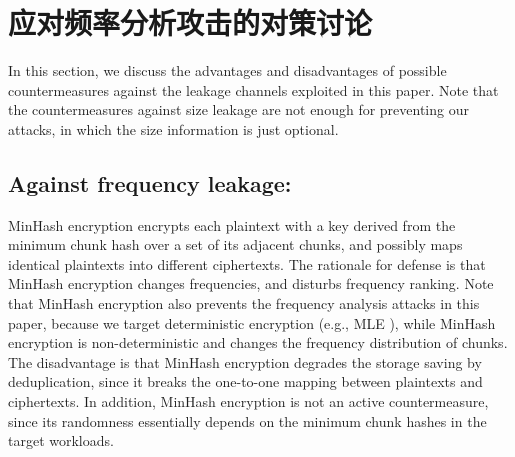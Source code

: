 \chapter{应对频率分析攻击的对策讨论}
\label{sec:Countermeasure}

In this section, we discuss the advantages and disadvantages of possible countermeasures against the leakage channels exploited in this paper. Note that the countermeasures against size leakage are not enough for preventing our attacks, in which the size information is just optional.  

\section{Against frequency leakage:}
MinHash encryption \cite{qin17, li17} encrypts each plaintext with a key derived from the minimum chunk hash over a set of its adjacent chunks, and possibly maps identical plaintexts into  different ciphertexts. The rationale for defense is that MinHash encryption changes frequencies, and disturbs frequency ranking. 
 Note that MinHash encryption also prevents the frequency analysis attacks in this paper, because  we target deterministic encryption (e.g., MLE \cite{bellare13a}), while MinHash encryption is non-deterministic and changes the  frequency distribution of chunks. The disadvantage is that MinHash encryption degrades the storage saving by deduplication, since it breaks the one-to-one mapping between plaintexts and ciphertexts. In addition, MinHash encryption is not an active countermeasure, since its randomness essentially depends on the minimum chunk hashes in the target workloads.            





